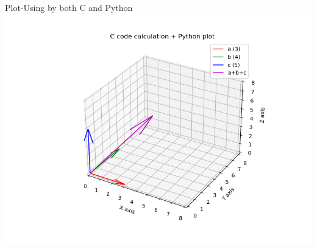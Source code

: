 \documentclass{beamer}
\begin{document}
\begin{frame}{Plot-Using by both C and Python}
    \centering
    \includegraphics[width=\columnwidth, height=0.8\textheight, keepaspectratio]{figs/fig4.1.png}     
\end{frame}
\end{document}
